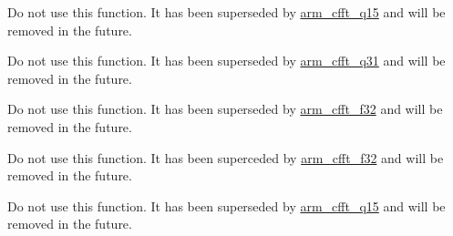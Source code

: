 \begin{DoxyRefList}
%
Do not use this function. It has been superseded by \mbox{\hyperlink{group___complex_f_f_t_ga68cdacd2267a2967955e40e6b7ec1229}{arm\+\_\+cfft\+\_\+q15}} and will be removed in the future.  
\item[Global \mbox{\hyperlink{group___complex_f_f_t_ga6321f703ec87a274aedaab33d3e766b4}{arm\+\_\+cfft\+\_\+radix2\+\_\+q31}} (const \mbox{\hyperlink{structarm__cfft__radix2__instance__q31}{arm\+\_\+cfft\+\_\+radix2\+\_\+instance\+\_\+q31}} $\ast$S, q31\+\_\+t $\ast$p\+Src)]\label{deprecated__deprecated000007}%
%
Do not use this function. It has been superseded by \mbox{\hyperlink{group___complex_f_f_t_ga5a0008bd997ab6e2e299ef2fb272fb4b}{arm\+\_\+cfft\+\_\+q31}} and will be removed in the future.  
\item[Global \mbox{\hyperlink{group___complex_f_f_t_ga521f670cd9c571bc61aff9bec89f4c26}{arm\+\_\+cfft\+\_\+radix4\+\_\+f32}} (const \mbox{\hyperlink{structarm__cfft__radix4__instance__f32}{arm\+\_\+cfft\+\_\+radix4\+\_\+instance\+\_\+f32}} $\ast$S, float32\+\_\+t $\ast$p\+Src)]\label{deprecated__deprecated000008}%
%
Do not use this function. It has been superseded by \mbox{\hyperlink{group___complex_f_f_t_gade0f9c4ff157b6b9c72a1eafd86ebf80}{arm\+\_\+cfft\+\_\+f32}} and will be removed in the future.  
\item[Global \mbox{\hyperlink{group___complex_f_f_t_gaf336459f684f0b17bfae539ef1b1b78a}{arm\+\_\+cfft\+\_\+radix4\+\_\+init\+\_\+f32}} (\mbox{\hyperlink{structarm__cfft__radix4__instance__f32}{arm\+\_\+cfft\+\_\+radix4\+\_\+instance\+\_\+f32}} $\ast$S, uint16\+\_\+t fft\+Len, uint8\+\_\+t ifft\+Flag, uint8\+\_\+t bit\+Reverse\+Flag)]\label{deprecated__deprecated000010}%
%
Do not use this function. It has been superceded by \mbox{\hyperlink{group___complex_f_f_t_gade0f9c4ff157b6b9c72a1eafd86ebf80}{arm\+\_\+cfft\+\_\+f32}} and will be removed in the future.  
\item[Global \mbox{\hyperlink{group___complex_f_f_t_ga0c2acfda3126c452e75b81669e8ad9ef}{arm\+\_\+cfft\+\_\+radix4\+\_\+init\+\_\+q15}} (\mbox{\hyperlink{structarm__cfft__radix4__instance__q15}{arm\+\_\+cfft\+\_\+radix4\+\_\+instance\+\_\+q15}} $\ast$S, uint16\+\_\+t fft\+Len, uint8\+\_\+t ifft\+Flag, uint8\+\_\+t bit\+Reverse\+Flag)]\label{deprecated__deprecated000011}%
%
Do not use this function. It has been superseded by \mbox{\hyperlink{group___complex_f_f_t_ga68cdacd2267a2967955e40e6b7ec1229}{arm\+\_\+cfft\+\_\+q15}} and will be removed in the future.  

\end{DoxyRefList}
